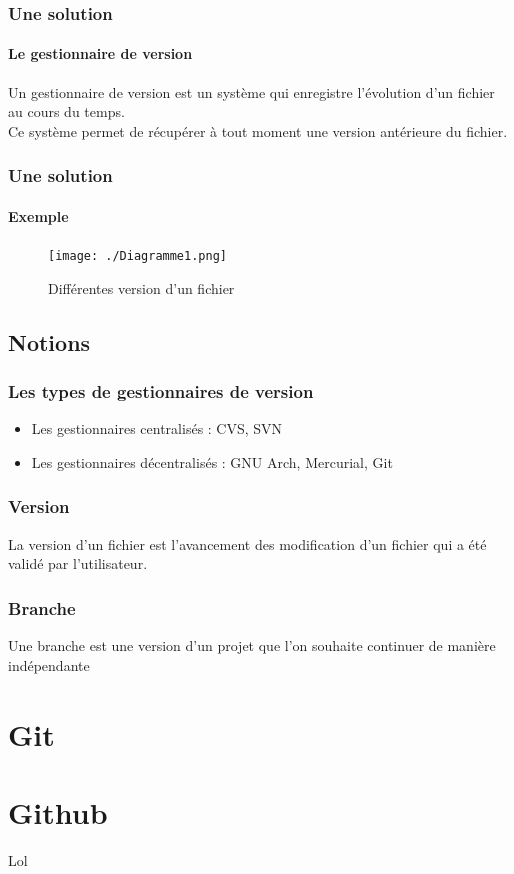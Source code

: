 \documentclass{beamer}
\begin{document}
\begin{frame}
\frametitle{Une solution}
  \framesubtitle{Le gestionnaire de version}
   Un gestionnaire de version est un système qui enregistre l'évolution d'un fichier au cours du temps.\\
   Ce système permet de récupérer à tout moment une version antérieure du fichier.
\end{frame}

\begin{frame}
 \frametitle{Une solution}
 \framesubtitle{Exemple}
\begin{figure}
 \centering
 \texttt{[image: ./Diagramme1.png]}
 \caption{Différentes version d'un fichier}
\end{figure}
\end{frame}



\subsection{Notions}
\begin{frame}
\frametitle{Les types de gestionnaires de version}
\begin{itemize}
 \item Les gestionnaires centralisés : CVS, SVN
 \item Les gestionnaires décentralisés : GNU Arch, Mercurial, Git
\end{itemize}
\end{frame}


\begin{frame}
\frametitle{Version}
La version d'un fichier est l'avancement des modification d'un fichier qui a été validé par l'utilisateur.
\end{frame}

\begin{frame}
\frametitle{Branche}
Une branche est une version d'un projet que l'on souhaite continuer de manière indépendante 
\end{frame}


\section{Git}

\section{Github}
\begin{frame}
 Lol
\end{frame}
\end{document}
